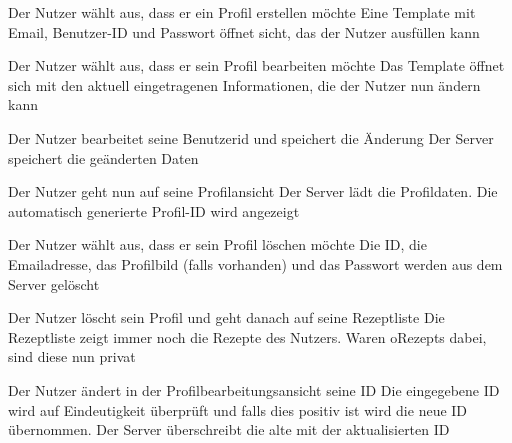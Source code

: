 
{Der Nutzer wählt aus, dass er ein Profil erstellen möchte}
{Eine \Gls{Template} mit Email, Benutzer-ID und Passwort öffnet sicht, das der Nutzer ausfüllen kann}

{Der Nutzer wählt aus, dass er sein Profil bearbeiten möchte}
{Das Template öffnet sich mit den aktuell eingetragenen Informationen, die der Nutzer nun ändern kann}

{Der Nutzer bearbeitet seine Benutzerid und speichert die Änderung}
{Der Server speichert die geänderten Daten}

{Der Nutzer geht nun auf seine \gls{Profilansicht}}
{Der Server lädt die Profildaten. Die automatisch generierte Profil-ID wird angezeigt}

{Der Nutzer wählt aus, dass er sein Profil löschen möchte}
{Die \gls{ID}, die Emailadresse, das Profilbild (falls vorhanden) und das Passwort werden aus dem Server gelöscht}

{Der Nutzer löscht sein Profil und geht danach auf seine \gls{Rezeptliste}}
{Die Rezeptliste zeigt immer noch die Rezepte des Nutzers. Waren \glspl{oRezept} dabei, sind diese nun privat}

{Der Nutzer ändert in der Profilbearbeitungsansicht seine ID}
{Die eingegebene ID wird auf Eindeutigkeit überprüft und falls dies positiv ist wird die neue ID übernommen. Der Server überschreibt die alte mit der aktualisierten ID}



